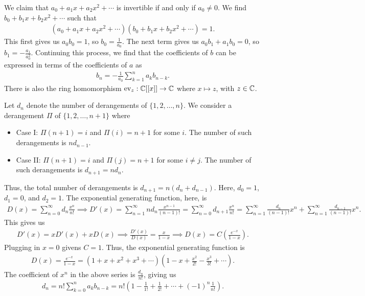 We claim that $a_{0}+a_{1}x+a_{2}x^{2}+\cdots$ is invertible if and only if $a_{0} \neq 0$. We find $b_{0}+b_{1}x+b_{2}x^{2}+\cdots$ such that
\begin{align}
    (a_{0}+a_{1}x+a_{2}x^{2}+\cdots)(b_{0}+b_{1}x+b_{2}x^{2}+\cdots) = 1.
\end{align}
This first gives us $a_{0}b_{0} = 1$, so $b_{0} = \frac{1}{a_{0}}$. The next term gives us $a_{0}b_{1}+a_{1}b_{0} = 0$, so $b_{1} = -\frac{a_{1}}{a_{0}^{2}}$. Continuing this process, we find that the coefficients of $b$ can be expressed in terms of the coefficients of $a$ as
\begin{align}
    b_{n} = -\frac{1}{a_{0}} \sum_{k=1}^{n} a_{k}b_{n-k}.
\end{align}
There is also the ring homomorphism $\operatorname{ev}_{z}:\mathbb{C}[[x]] \to \mathbb{C}$ where $x \mapsto z$, with $z \in \mathbb{C}$.

\begin{example}
    Let $d_{n}$ denote the number of derangements of $\{1,2,\ldots,n\}$. We consider a derangement $\Pi$ of $\{1,2,\ldots,n+1\}$ where
    \begin{itemize}
        \item Case I: $\Pi(n+1) = i$ and $\Pi(i) = n+1$ for some $i$. The number of such derangements is $nd_{n-1}$.
        \item Case II: $\Pi(n+1) = i$ and $\Pi(j) = n+1$ for some $i \neq j$. The number of such derangements is $d_{n+1} = nd_{n}$.
    \end{itemize}
    Thus, the total number of derangements is $d_{n+1} = n(d_{n}+d_{n-1})$.
    Here, $d_{0} = 1$, $d_{1} = 0$, and $d_{2} = 1$. The exponential generating function, here, is
    \begin{align}
        D(x) = \sum_{n=0}^{\infty} d_{n} \frac{x^{n}}{n!} \implies D'(x) = \sum_{n=1}^{\infty} nd_{n} \frac{x^{n-1}}{(n-1)!} = \sum_{n=0}^{\infty} d_{n+1} \frac{x^{n}}{n!} = \sum_{n=1}^{\infty} \frac{d_{n}}{(n-1)!} x^{n} + \sum_{n=1}^{\infty} \frac{d_{n-1}}{(n-1)!} x^{n}.
    \end{align}
    This gives us
    \begin{align}
        D'(x) = xD'(x) + xD(x) \implies \frac{D'(x)}{D(x)} = \frac{x}{1-x} \implies D(x) = C \left( \frac{e^{-x}}{1-x} \right).
    \end{align}
    Plugging in $x = 0$ givens $C = 1$. Thus, the exponential generating function is
    \begin{align}
        D(x) = \frac{e^{-x}}{1-x} = (1+x+x^{2}+x^{3}+\cdots)(1-x+\frac{x^{2}}{2!}-\frac{x^{3}}{3!}+\cdots).
    \end{align}
    The coefficient of $x^{n}$ in the above series is $\frac{d_{n}}{n!}$, giving us
    \begin{align}
        d_{n} = n! \sum_{k=0}^{n} a_{k}b_{n-k} = n! \left( 1-\frac{1}{1!}+\frac{1}{2!} + \cdots + (-1)^{n}\frac{1}{n!} \right).
    \end{align}
\end{example}

